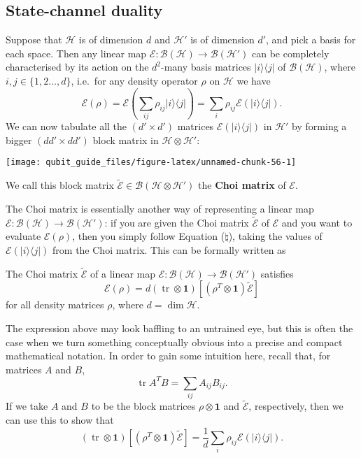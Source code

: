 \documentclass[fleqn]{article}
\newenvironment{idea}{\noindent}{\medskip}
\begin{document}
\hypertarget{state-channel-duality}{%
\subsection{State-channel duality}\label{state-channel-duality}}

Suppose that \(\mathcal{H}\) is of dimension \(d\) and \(\mathcal{H}'\) is of dimension \(d'\), and pick a basis for each space.
Then any linear map \(\mathcal{E}\colon\mathcal{B}(\mathcal{H})\to\mathcal{B}(\mathcal{H'})\) can be completely characterised by its action on the \(d^2\)-many basis matrices \(|i\rangle\langle j|\) of \(\mathcal{B}(\mathcal{H})\), where \(i,j\in\{1,2\ldots,d\}\), i.e.~for any density operator \(\rho\) on \(\mathcal{H}\) we have
\[
  \mathcal{E}(\rho)
  = \mathcal{E}\left(\sum_{ij}\rho_{ij} |i\rangle\langle j|\right)
  = \sum_i\rho_{ij}\mathcal{E}(|i\rangle\langle j|).
\tag{$\natural$}
\]
We can now tabulate all the \((d'\times d')\) matrices \(\mathcal{E}(|i\rangle\langle j|)\) in \(\mathcal{H}'\) by forming a bigger \((dd'\times dd')\) block matrix in \(\mathcal{H}\otimes\mathcal{H}'\):

\begin{center}\texttt{[image: qubit\_guide\_files/figure-latex/unnamed-chunk-56-1]} \end{center}

We call this block matrix \(\widetilde{\mathcal{E}}\in\mathcal{B}(\mathcal{H}\otimes\mathcal{H}')\) the \textbf{Choi matrix} of \(\mathcal{E}\).

The Choi matrix is essentially another way of representing a linear map \(\mathcal{E}\colon\mathcal{B}(\mathcal{H})\to\mathcal{B}(\mathcal{H'})\): if you are given the Choi matrix \(\widetilde{\mathcal{E}}\) of \(\mathcal{E}\) and you want to evaluate \(\mathcal{E}(\rho)\), then you simply follow Equation (\(\natural\)), taking the values of \(\mathcal{E}(|i\rangle\langle j|)\) from the Choi matrix.
This can be formally written as

\begin{idea}
The Choi matrix \(\widetilde{\mathcal{E}}\) of a linear map \(\mathcal{E}\colon\mathcal{B}(\mathcal{H})\to\mathcal{B}(\mathcal{H'})\) satisfies
\[
  \mathcal{E}(\rho)
  = d(\operatorname{tr}\otimes\mathbf{1})\left[(\rho^T\otimes\mathbf{1})\widetilde{\mathcal{E}}\right]
\]
for all density matrices \(\rho\), where \(d=\dim\mathcal{H}\).

\end{idea}

The expression above may look baffling to an untrained eye, but this is often the case when we turn something conceptually obvious into a precise and compact mathematical notation.
In order to gain some intuition here, recall that, for matrices \(A\) and \(B\),
\[
  \operatorname{tr}A^T B = \sum_{ij} A_{ij}B_{ij}.
\]
If we take \(A\) and \(B\) to be the block matrices \(\rho\otimes\mathbf{1}\) and \(\widetilde{\mathcal{E}}\), respectively, then we can use this to show that
\[
  (\operatorname{tr}\otimes\mathbf{1})\left[(\rho^T\otimes\mathbf{1})\widetilde{\mathcal{E}}\right]
  = \frac{1}{d}\sum_i\rho_{ij}\mathcal{E}(|i\rangle\langle j|).
\]
\end{document}
